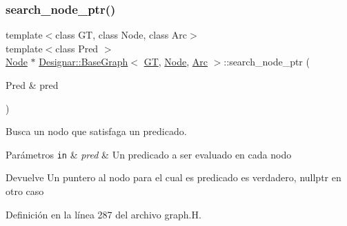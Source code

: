 \subsubsection{\texorpdfstring{search\+\_\+node\+\_\+ptr()}{search\_node\_ptr()}\hspace{0.1cm}{\footnotesize\ttfamily [1/2]}}
{\footnotesize\ttfamily template$<$class GT, class Node, class Arc$>$ \\
template$<$class Pred $>$ \\
\hyperlink{namespace_designar_a5af326c65aa2bd26b26c410f2030d09e}{Node} $\ast$ \hyperlink{class_designar_1_1_base_graph}{Designar\+::\+Base\+Graph}$<$ \hyperlink{demo-buildgraph_8_c_a3001c40d2c31ca87ed96cd7d1334a55e}{GT}, \hyperlink{namespace_designar_a5af326c65aa2bd26b26c410f2030d09e}{Node}, \hyperlink{namespace_designar_a3f55fb5513d62ff47cbc8f72b8e95d6f}{Arc} $>$\+::search\+\_\+node\+\_\+ptr (\begin{DoxyParamCaption}\item[{Pred \&}]{pred }\end{DoxyParamCaption})\hspace{0.3cm}{\ttfamily [inline]}}



Busca un nodo que satisfaga un predicado. 


\begin{DoxyParams}[1]{Parámetros}
\mbox{\tt in}  & {\em pred} & Un predicado a ser evaluado en cada nodo \\
\hline
\end{DoxyParams}
\begin{DoxyReturn}{Devuelve}
Un puntero al nodo para el cual es predicado es verdadero, {\ttfamily nullptr} en otro caso 
\end{DoxyReturn}


Definición en la línea 287 del archivo graph.\+H.

\mbox{\label{class_designar_1_1_base_graph_af19f6876395f82edc748b8c7ec7413f8}} 
